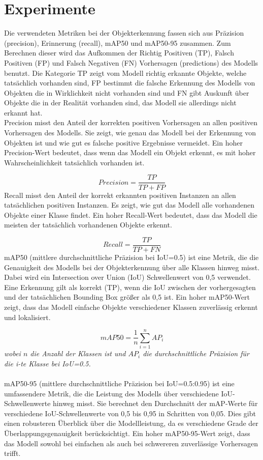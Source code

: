 \chapter{Experimente}
\label{ch:experimente}

Die verwendeten Metriken bei der Objekterkennung fassen sich aus Präzision (precision), Erinnerung (recall), mAP50 und mAP50-95 zusammen. Zum Berechnen dieser wird das Aufkommen der Richtig Positiven (TP), Falsch Positiven (FP) und Falsch Negativen (FN) Vorhersagen (predictions) des Modells benutzt. Die Kategorie TP zeigt vom Modell richtig erkannte Objekte, welche tatsächlich vorhanden sind, FP bestimmt die falsche Erkennung des Modells von Objekten die in Wirklichkeit nicht vorhanden sind und FN gibt Auskunft über Objekte die in der Realität vorhanden sind, das Modell sie allerdings nicht erkannt hat.
\\

Precision misst den Anteil der korrekten positiven Vorhersagen an allen positiven Vorhersagen des Modells. Sie zeigt, wie genau das Modell bei der Erkennung von Objekten ist und wie gut es falsche positive Ergebnisse vermeidet. Ein hoher Precision-Wert bedeutet, dass wenn das Modell ein Objekt erkennt, es mit hoher Wahrscheinlichkeit tatsächlich vorhanden ist.

\[Precision = \frac{TP}{TP + FP}\]
Recall misst den Anteil der korrekt erkannten positiven Instanzen an allen tatsächlichen positiven Instanzen. Es zeigt, wie gut das Modell alle vorhandenen Objekte einer Klasse findet. Ein hoher Recall-Wert bedeutet, dass das Modell die meisten der tatsächlich vorhandenen Objekte erkennt.

\[Recall = \frac{TP}{TP + FN}\]
mAP50 (mittlere durchschnittliche Präzision bei IoU=0.5) ist eine Metrik, die die Genauigkeit des Modells bei der Objekterkennung über alle Klassen hinweg misst. Dabei wird ein Intersection over Union (IoU) Schwellenwert von 0,5 verwendet. Eine Erkennung gilt als korrekt (TP), wenn die IoU zwischen der vorhergesagten und der tatsächlichen Bounding Box größer als 0,5 ist. Ein hoher mAP50-Wert zeigt, dass das Modell einfache Objekte verschiedener Klassen zuverlässig erkennt und lokalisiert.

\[mAP50 = \frac{1}{n} \sum_{i=1}^{n} AP_i\]
\emph{wobei $n$ die Anzahl der Klassen ist und $AP_i$ die durchschnittliche Präzision für die i-te Klasse bei IoU=0.5.}
\\\\
mAP50-95 (mittlere durchschnittliche Präzision bei IoU=0.5:0.95) ist eine umfassendere Metrik, die die Leistung des Modells über verschiedene IoU-Schwellenwerte hinweg misst. Sie berechnet den Durchschnitt der mAP-Werte für verschiedene IoU-Schwellenwerte von 0,5 bis 0,95 in Schritten von 0,05. Dies gibt einen robusteren Überblick über die Modellleistung, da es verschiedene Grade der Überlappungsgenauigkeit berücksichtigt. Ein hoher mAP50-95-Wert zeigt, dass das Modell sowohl bei einfachen als auch bei schwereren zuverlässige Vorhersagen trifft.

